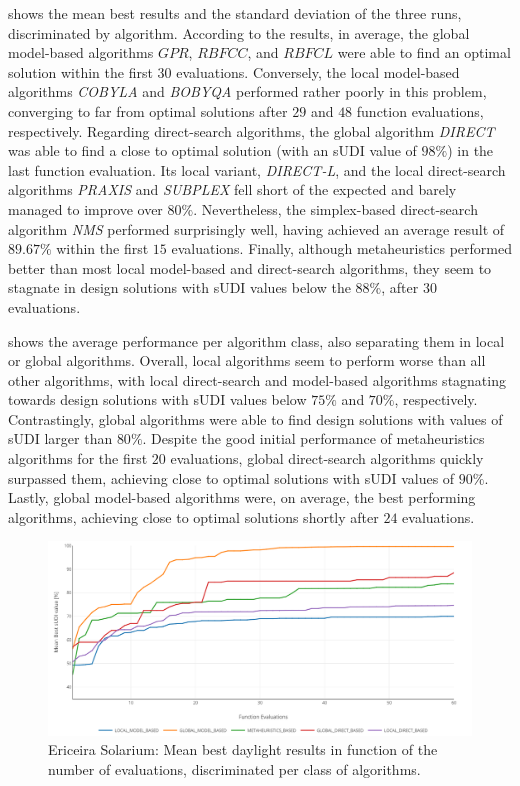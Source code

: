  shows the mean best results and the standard deviation of the three runs, discriminated by algorithm. According to the results, in average, the global model-based algorithms $GPR$, $RBFCC$, and $RBFCL$ were able to find an optimal solution within the first $30$ evaluations. Conversely, the local model-based algorithms \textit{COBYLA} and \textit{BOBYQA} performed rather poorly in this problem, converging to far from optimal solutions after $29$ and $48$ function evaluations, respectively. Regarding direct-search algorithms, the global algorithm \textit{DIRECT} was able to find a close to optimal solution (with an \ac{sUDI} value of $98\%$) in the last function evaluation. Its local variant, \textit{DIRECT-L}, and the local direct-search algorithms \textit{PRAXIS} and \textit{SUBPLEX} fell short of the expected and barely managed to improve over $80\%$. Nevertheless, the simplex-based direct-search algorithm \textit{NMS} performed surprisingly well, having achieved an average result of $89.67\%$ within the first $15$ evaluations. Finally, although metaheuristics performed better than most local model-based and direct-search algorithms, they seem to stagnate in design solutions with \ac{sUDI} values below the $88\%$, after $30$ evaluations.

 shows the average performance per algorithm class, also separating them in local or global algorithms. Overall, local algorithms seem to perform worse than all other algorithms, with local direct-search and model-based algorithms stagnating towards design solutions with \ac{sUDI} values below $75\%$ and $70\%$, respectively. Contrastingly, global algorithms were able to find design solutions with values of \ac{sUDI} larger than $80\%$. Despite the good initial performance of metaheuristics algorithms for the first $20$ evaluations, global direct-search algorithms quickly surpassed them, achieving close to optimal solutions with \ac{sUDI} values of $90\%$. Lastly, global model-based algorithms were, on average, the best performing algorithms, achieving close to optimal solutions shortly after $24$ evaluations. 

\begin{figure}[htbp]
	\centering
	\includegraphics[width=1\textwidth]{Images/Evaluation/Ericeira_results_ph1_per_class.PNG}
	\caption[Ericeira Solarium: Mean best daylight results in function of the number of evaluations, discriminated per class of algorithms]{Ericeira Solarium: Mean best daylight results in function of the number of evaluations, discriminated per class of algorithms.}
	\label{fig:phase1results}
\end{figure}

